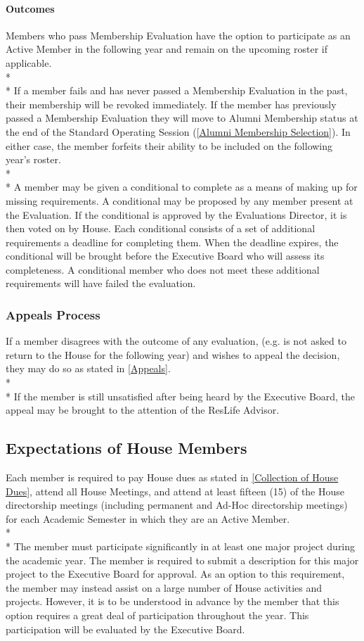 \documentclass{article}
\newcommand{\bsection}[1]{\subsection{#1} \label{#1}}
\newcommand{\bsubsection}[1]{\subsubsection{#1} \label{#1}}
\newcommand{\bsubsubsection}[1]{\paragraph{#1} \label{#1}}
\begin{document}
\bsubsubsection{Outcomes}
Members who pass Membership Evaluation have the option to participate as an Active Member in the following year and remain on the upcoming roster if applicable.
\\* \\*
If a member fails and has never passed a Membership Evaluation in the past, their membership will be revoked immediately.
If the member has previously passed a Membership Evaluation they will move to Alumni Membership status at the end of the Standard Operating Session (\ref{Alumni Membership Selection}).
In either case, the member forfeits their ability to be included on the following year’s roster.
\\* \\*
A member may be given a conditional to complete as a means of making up for missing requirements.
A conditional may be proposed by any member present at the Evaluation.
If the conditional is approved by the Evaluations Director, it is then voted on by House.
Each conditional consists of a set of additional requirements a deadline for completing them.
When the deadline expires, the conditional will be brought before the Executive Board who will assess its completeness.
A conditional member who does not meet these additional requirements will have failed the evaluation.
\bsubsection{Appeals Process}
If a member disagrees with the outcome of any evaluation, (e.g. is not asked to return to the House for the following year) and wishes to appeal the decision, they may do so as stated in \ref{Appeals}.
\\* \\*
If the member is still unsatisfied after being heard by the Executive Board, the appeal may be brought to the attention of the ResLife Advisor.

\bsection{Expectations of House Members}
Each member is required to pay House dues as stated in \ref{Collection of House Dues}, attend all House Meetings, and attend at least fifteen (15) of the House directorship meetings (including permanent and Ad-Hoc directorship meetings) for each Academic Semester in which they are an Active Member.
\\* \\*
The member must participate significantly in at least one major project during the academic year.
The member is required to submit a description for this major project to the Executive Board for approval.
As an option to this requirement, the member may instead assist on a large number of House activities and projects.
However, it is to be understood in advance by the member that this option requires a great deal of participation throughout the year.
This participation will be evaluated by the Executive Board.
\end{document}
